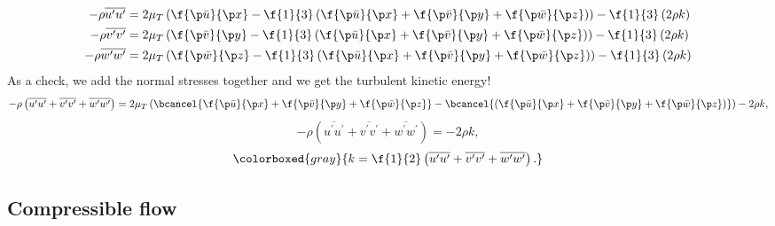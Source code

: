 \begin{equation}
  \begin{aligned}
  -\rho \overline{u^\prime u^\prime}
  &=
  2 \mu_T \left(
            \f{\p \bar{u}}{\p x}
            - \f{1}{3} \left(\f{\p \bar{u}}{\p x} + \f{\p \bar{v}}{\p y} + \f{\p \bar{w}}{\p z}\right)
          \right)
  - \f{1}{3}\left(2 \rho k\right) \\
  -\rho \overline{v^\prime v^\prime}
  &=
  2 \mu_T \left(
            \f{\p \bar{v}}{\p y}
            - \f{1}{3} \left(\f{\p \bar{u}}{\p x} + \f{\p \bar{v}}{\p y} + \f{\p \bar{w}}{\p z}\right)
          \right)
  - \f{1}{3}\left(2 \rho k\right) \\
  -\rho \overline{w^\prime w^\prime}
  &=
  2 \mu_T \left(
            \f{\p \bar{w}}{\p z}
            - \f{1}{3} \left(\f{\p \bar{u}}{\p x} + \f{\p \bar{v}}{\p y} + \f{\p \bar{w}}{\p z}\right)
          \right)
  - \f{1}{3}\left(2 \rho k\right)
  \end{aligned}
\end{equation}
%
As a check, we add the normal stresses together and we get the turbulent kinetic energy!
%
\begin{equation}
   -\rho \left(\overline{u^\prime u^\prime} + \overline{v^\prime v^\prime} + \overline{w^\prime w^\prime}\right)
   =
   2 \mu_T
   \left(
     \bcancel{\f{\p \bar{u}}{\p x} + \f{\p \bar{v}}{\p y} + \f{\p \bar{w}}{\p z}}
     - \bcancel{\left(\f{\p \bar{u}}{\p x} + \f{\p \bar{v}}{\p y} + \f{\p \bar{w}}{\p z}\right)}
   \right)
   - 2 \rho k,
\end{equation}
%
\begin{equation}
   -\rho \left(\overline{u^\prime u^\prime} + \overline{v^\prime v^\prime} + \overline{w^\prime w^\prime}\right)
   =
   - 2 \rho k,
\end{equation}
%
\begin{equation}
  \colorboxed{gray}{
    k = \f{1}{2} \left(\overline{u^\prime u^\prime} + \overline{v^\prime v^\prime} + \overline{w^\prime w^\prime}\right).
  }
\end{equation}


\subsection{Compressible flow}

